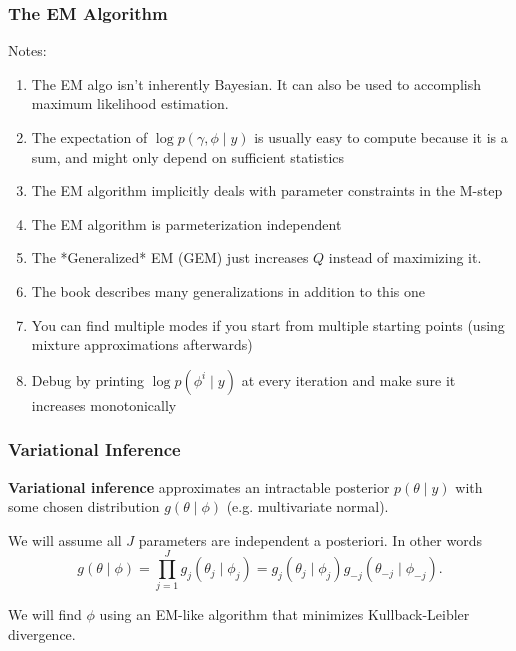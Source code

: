\documentclass{beamer}
\begin{document}
\begin{frame}[fragile]
\frametitle{The EM Algorithm}

Notes:
\begin{enumerate}
\item The EM algo isn't inherently Bayesian. It can also be used to accomplish maximum likelihood estimation.
\item The expectation of $\log p(\gamma, \phi \mid y)$ is usually easy to compute because it is a sum, and might only depend on sufficient statistics
\item The EM algorithm implicitly deals with parameter constraints in the M-step
\item The EM algorithm is parmeterization independent
\item The *Generalized* EM (GEM) just increases $Q$ instead of maximizing it.
\item The book describes many generalizations in addition to this one
\item You can find multiple modes if you start from multiple starting points (using mixture approximations afterwards)
\item Debug by printing $\log p(\phi^i \mid y)$ at every iteration and make sure it increases monotonically
\end{enumerate}

\end{frame}


\begin{frame}[fragile]
\frametitle{Variational Inference}

{\bf Variational inference} approximates an intractable posterior $p(\theta \mid y)$ with some chosen distribution $g(\theta \mid \phi)$ (e.g. multivariate normal).
\newline
\pause

We will assume all $J$ parameters are independent a posteriori. In other words 
$$
g(\theta \mid \phi) = \prod_{j=1}^J g_j(\theta_j \mid \phi_j) = g_j(\theta_j \mid \phi_j)g_{-j}(\theta_{-j} \mid \phi_{-j}).
$$


We will find $\phi$ using an EM-like algorithm that minimizes Kullback-Leibler divergence.

\end{frame}
\end{document}

